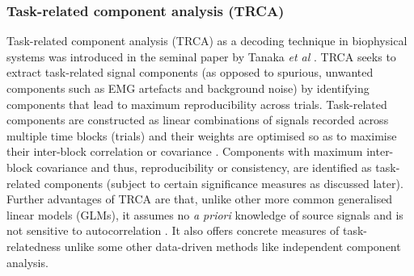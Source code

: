 \subsubsection{Task-related component analysis (TRCA)}
\label{section:trca-c2}
Task-related component analysis (TRCA) as a decoding technique in biophysical systems was introduced in the seminal paper by Tanaka \textit{et al} \cite{tanaka-trca}. TRCA seeks to extract task-related signal components (as opposed to spurious, unwanted components such as EMG artefacts and background noise) by identifying components that lead to maximum reproducibility across trials. Task-related components are constructed as linear combinations of signals recorded across multiple time blocks (trials) and their weights are optimised so as to maximise their inter-block correlation or covariance \cite{tanaka-trca}. Components with maximum inter-block covariance and thus, reproducibility or consistency, are identified as task-related components (subject to certain significance measures as discussed later). Further advantages of TRCA are that, unlike other more common generalised linear models (GLMs), it assumes no \textit{a priori} knowledge of source signals and is not sensitive to autocorrelation \cite{tanaka-trca}. It also offers concrete measures of task-relatedness unlike some other data-driven methods like independent component analysis.

